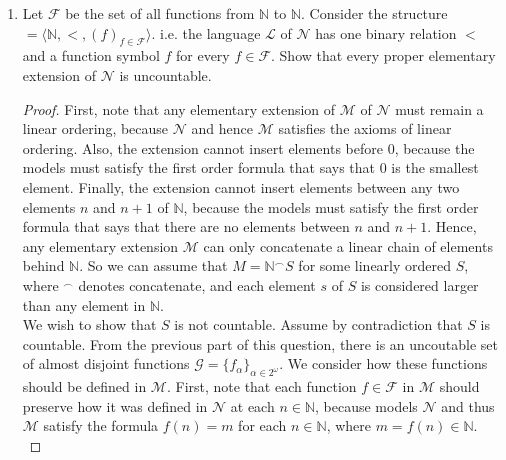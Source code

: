 \documentclass{article}
\begin{document}
\begin{enumerate}[label={\bf Q\arabic*:}]
\begin{enumerate}
      \item Let $\mathcal{F}$ be the set of all functions from $\mathbb{N}$
        to $\mathbb{N}$. Consider the structure
        $\mathcal=\langle\mathbb{N},<,(f)_{f\in\mathcal{F}}\rangle$. i.e. the
        language $\mathcal{L}$ of $\mathcal{N}$ has one binary relation $<$
        and a function symbol $f$ for every $f\in\mathcal{F}$. Show that
        every proper elementary extension of $\mathcal{N}$ is uncountable.

        \begin{proof}
          First, note that any elementary extension of $\mathcal{M}$ of
          $\mathcal{N}$ must remain a linear ordering, because
          $\mathcal{N}$ and hence $\mathcal{M}$ satisfies the axioms of
          linear ordering. Also, the extension cannot insert elements
          before $0$, because the models must satisfy the first order
          formula that says that $0$ is the smallest element. Finally, the
          extension cannot insert elements between any two elements $n$ and
          $n+1$ of $\mathbb{N}$, because the models must satisfy the first
          order formula that says that there are no elements between $n$
          and $n+1$. Hence, any elementary extension $\mathcal{M}$ can only
          concatenate a linear chain of elements behind $\mathbb{N}$. So we
          can assume that $M=\mathbb{N}^\frown S$ for some linearly ordered
          $S$, where $^\frown$ denotes concatenate, and each element $s$ of
          $S$ is considered larger than any element in $\mathbb{N}$. \\

          We wish to show that $S$ is not countable. Assume by
          contradiction that $S$ is countable. From the previous part of
          this question, there is an uncoutable set of almost disjoint
          functions $\mathcal{G}=\{f_{\alpha}\}_{\alpha\in2^\omega}$. We
          consider how these functions should be defined in $\mathcal{M}$.
          First, note that each function $f\in\mathcal{F}$ in $\mathcal{M}$
          should preserve how it was defined in $\mathcal{N}$ at each
          $n\in\mathbb{N}$, because models $\mathcal{N}$ and thus
          $\mathcal{M}$ satisfy the formula $f(n)=m$ for each
          $n\in\mathbb{N}$, where $m=f(n)\in\mathbb{N}$.  \\


\end{proof}
\end{enumerate}
\end{enumerate}
\end{document}
